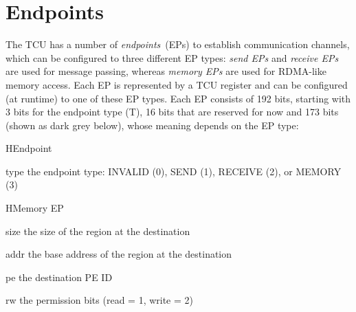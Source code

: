 \documentclass[a4paper,11pt,draft]{article}
\begin{document}
\section{Endpoints}

The TCU has a number of \emph{endpoints}~(EPs) to establish communication channels, which can be
configured to three different EP types: \emph{send EPs} and \emph{receive EPs} are used for message
passing, whereas \emph{memory EPs} are used for RDMA-like memory access. Each EP is represented by a
TCU register and can be configured (at runtime) to one of these EP types. Each EP consists of 192
bits, starting with 3 bits for the endpoint type (T), 16 bits that are reserved for now and
173 bits (shown as dark grey below), whose meaning depends on the EP type:\\[.1em]

\begin{register}{H}{Endpoint}{}
  \regnewline%
  \regnewline%
  \regnewline%
  \begin{regdesc}\begin{reglist}
    \item[type] the endpoint type: INVALID (0), SEND (1), RECEIVE (2), or MEMORY (3)
  \end{reglist}\end{regdesc}
\end{register}

\begin{register}{H}{Memory EP}{}
  \regnewline%
  \regnewline%
  \regnewline%
  \begin{regdesc}\begin{reglist}
    \item[size] the size of the region at the destination
    \item[addr] the base address of the region at the destination
    \item[pe] the destination PE ID
    \item[rw] the permission bits (read = 1, write = 2)
  \end{reglist}\end{regdesc}
\end{register}
\end{document}
